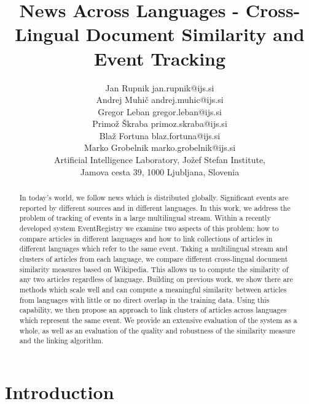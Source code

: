 \documentclass[twoside,11pt]{article}
\begin{document}
\title{News Across Languages -
Cross-Lingual Document Similarity and Event Tracking}

\author{\name Jan Rupnik \email jan.rupnik@ijs.si \\
       \name Andrej Muhi\v{c} \email andrej.muhic@ijs.si \\
       \name Gregor Leban \email gregor.leban@ijs.si \\
       \name Primo\v{z} \v{S}kraba \email primoz.skraba@ijs.si \\
       \name Bla\v{z} Fortuna \email blaz.fortuna@ijs.si \\
       \name Marko Grobelnik \email marko.grobelnik@ijs.si \\
       \addr Artificial Intelligence Laboratory, Jo\v{z}ef Stefan Institute,\\
       Jamova cesta 39, 1000 Ljubljana, Slovenia}

\maketitle

\begin{abstract}

In today's world, we follow news which is distributed globally. Significant events are reported by different sources and in different languages. In this work, we address the problem of tracking of events in a large multilingual stream. Within a recently developed system EventRegistry   we examine two aspects of this problem: how to compare articles in different languages and how to link collections of articles in different languages which refer to the same event.  Taking a multilingual stream and clusters of articles from each language, we compare different cross-lingual document similarity measures based on Wikipedia. This allows us to compute the similarity of any two articles regardless of language. Building on previous work, we show there are methods which scale well and can compute a meaningful similarity between articles from languages with little or no direct overlap in the training data.
Using this capability, we then propose an approach to link clusters of articles across languages which represent the same event. We provide an extensive evaluation of the system as a whole, as well as an evaluation of the quality and robustness of the similarity measure and the linking algorithm.
\end{abstract}

\section{Introduction}
\end{document}
